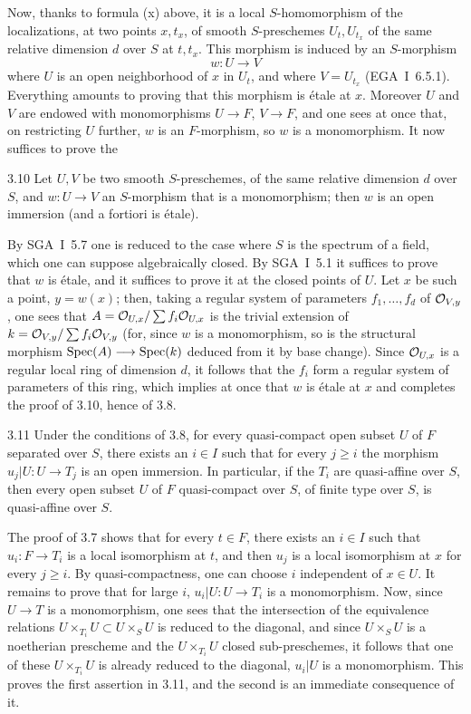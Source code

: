 Now, thanks to formula (x) above, it is a local $S$-homomorphism of the localizations, at two points $x,t_x$, of smooth $S$-preschemes $U_t,U_{t_x}$ of the same relative dimension $d$ over $S$ at $t,t_x$. This morphism is induced by an $S$-morphism
\[
w:U\to V
\]
where $U$ is an open neighborhood of $x$ in $U_t$, and where $V=U_{t_x}$ (EGA~I~6.5.1). Everything amounts to proving that this morphism is étale at $x$. Moreover $U$ and $V$ are endowed with monomorphisms $U\to F$, $V\to F$, and one sees at once that, on restricting $U$ further, $w$ is an $F$-morphism, so $w$ is a monomorphism. It now suffices to prove the
\begin{lemma}{3.10}\label{XI.3.10}
Let $U,V$ be two smooth $S$-preschemes, of the same relative dimension $d$ over $S$, and $w:U\to V$ an $S$-morphism that is a monomorphism; then $w$ is an open immersion (and a fortiori is étale).
\end{lemma}
By SGA~I~5.7 one is reduced to the case where $S$ is the spectrum of a field, which one can suppose algebraically closed. By SGA~I~5.1 it suffices to prove that $w$ is étale, and it suffices to prove it at the closed points of $U$. Let $x$ be such a point, $y=w(x)$; then, taking a regular system of parameters $f_1,\ldots,f_d$ of $\mathcal{O}_{V,y}$, one sees that $A=\mathcal{O}_{U,x}/\sum f_i\mathcal{O}_{U,x}$ is the trivial extension of $k=\mathcal{O}_{V,y}/\sum f_i\mathcal{O}_{V,y}$ (for, since $w$ is a monomorphism, so is the structural morphism $\operatorname{Spec}(A)\longrightarrow\operatorname{Spec}(k)$ deduced from it by base change). Since $\mathcal{O}_{U,x}$ is a regular local ring of dimension $d$, it follows that the $f_i$ form a regular system of parameters of this ring, which implies at once that $w$ is étale at $x$ and completes the proof of 3.10, hence of 3.8.

\begin{corollary}{3.11}\label{XI.3.11}
Under the conditions of 3.8, for every quasi-compact open subset $U$ of $F$ separated over $S$, there exists an $i\in I$ such that for every $j\ge i$ the morphism $u_j|U:U\to T_j$ is an open immersion. In particular, if the $T_i$ are quasi-affine over $S$, then every open subset $U$ of $F$ quasi-compact over $S$, \ie of finite type over $S$, is quasi-affine over $S$.
\end{corollary}
The proof of 3.7 shows that for every $t\in F$, there exists an $i\in I$ such that $u_i:F\to T_i$ is a local isomorphism at $t$, and then $u_j$ is a local isomorphism at $x$ for every $j\ge i$. By quasi-compactness, one can choose $i$ independent of $x\in U$. It remains to prove that for large $i$, $u_i|U:U\to T_i$ is a monomorphism. Now, since $U\to T$ is a monomorphism, one sees that the intersection of the equivalence relations $U\times_{T_i}U\subset U\times_S U$ is reduced to the diagonal, and since $U\times_S U$ is a noetherian prescheme and the $U\times_{T_i}U$ closed sub-preschemes, it follows that one of these $U\times_{T_i}U$ is already reduced to the diagonal, \ie $u_i|U$ is a monomorphism. This proves the first assertion in 3.11, and the second is an immediate consequence of it.

